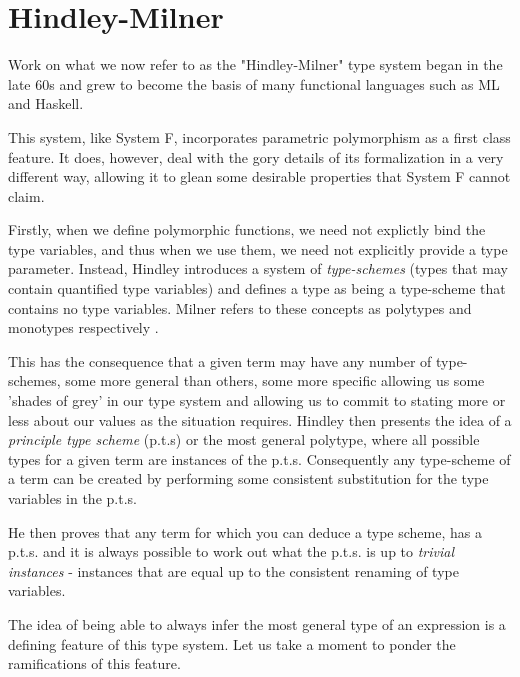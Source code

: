 \documentclass{ProgressReport}[2020/09/15]
\begin{document}
          \section{Hindley-Milner}

            Work on what we now refer to as the "Hindley-Milner" type system began
            in the late 60s and grew to become the basis of many functional
            languages such as ML and Haskell.
            
            This system, like System F, incorporates parametric polymorphism as a
            first class feature. It does, however, deal with the gory details of
            its formalization in a very different way, allowing it to glean some
            desirable properties that System F cannot claim.
            
            Firstly, when we define polymorphic functions, we need not explictly
            bind the type variables, and thus when we use them, we need not
            explicitly provide a type parameter. Instead, Hindley introduces a
            system of \textit{type-schemes} \cite{hindley1969} (types
            that may contain quantified type variables) and defines a
            type as being a type-scheme that contains no type
            variables. Milner refers to these concepts as polytypes
            and monotypes respectively \cite{milner1978}.
            
            This has the consequence that a given term may have any number of
            type-schemes, some more general than others, some more specific
            allowing us some 'shades of grey' in our type system and allowing us
            to commit to stating more or less about our values as the situation
            requires. Hindley then presents the idea of a \textit{principle type
              scheme} (p.t.s) or the most general polytype, where all possible
            types for a given term are instances of the p.t.s. Consequently any
            type-scheme of a term can be created by performing some consistent
            substitution for the type variables in the p.t.s. 
            
            He then proves that any term for which you can deduce a type scheme,
            has a p.t.s. and it is always possible to work out what the p.t.s. is
            up to \textit{trivial instances} - instances that are equal up to the
            consistent renaming of type variables.
            
            The idea of being able to always infer the most general type of an
            expression is a defining feature of this type system. Let us take a
            moment to ponder the ramifications of this feature.
            
\end{document}
